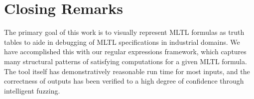 \documentclass[runningheads]{llncs}
\renewcommand{\phi}{\varphi}
\begin{document}

\section{Closing Remarks}
\label{Conclusion}
The primary goal of this work is to visually represent MLTL formulas as truth tables to aide in debugging of MLTL specifications in industrial domains. We have accomplished this with our regular expressions framework, which captures many structural patterns of satisfying computations for a given MLTL formula. The tool itself has demonstratively reasonable run time for most inputs, and the correctness of outputs has been verified to a high degree of confidence through intelligent fuzzing.
\end{document}
